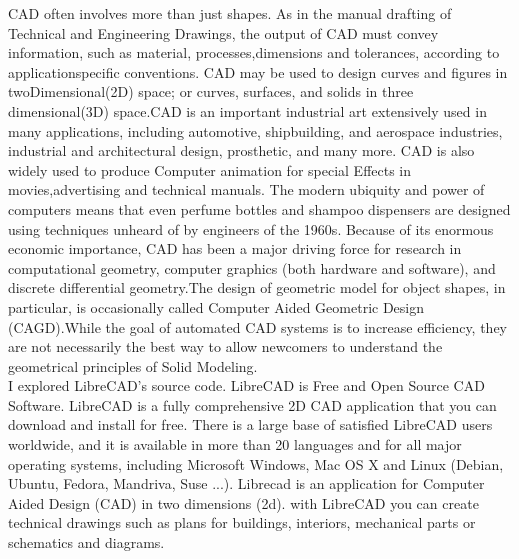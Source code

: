   CAD  often  involves  more  than  just  shapes.  As  in  the  manual  drafting  of  Technical  and  Engineering
Drawings,  the  output  of  CAD  must  convey  information,  such  as  material,  processes,dimensions  and
tolerances,  according  to  application­specific  conventions.  CAD  may  be  used  to  design  curves  and
figures  in  two­Dimensional(2D)  space;  or  curves,  surfaces,  and  solids  in  three  dimensional(3D)
space.CAD  is  an  important  industrial  art  extensively  used  in  many  applications,  including  automotive,
shipbuilding,  and  aerospace  industries,  industrial  and  architectural  design, prosthetic,  and  many  more.
CAD  is  also  widely  used  to  produce  Computer  animation  for  special  Effects  in  movies,advertising  and
technical  manuals.  The  modern  ubiquity  and  power  of  computers  means  that  even  perfume  bottles  and
shampoo  dispensers  are  designed  using   techniques unheard of by engineers of the 1960s. Because  of its
enormous  economic  importance,  CAD  has  been  a  major  driving  force  for  research  in  computational
geometry,  computer  graphics  (both  hardware  and  software),  and  discrete  differential  geometry.The
design  of  geometric  model  for  object  shapes,  in  particular,  is  occasionally  called  Computer ­Aided
Geometric  Design  (CAGD).While  the  goal  of  automated  CAD  systems  is to increase efficiency, they are
not  necessarily  the  best  way   to  allow  newcomers  to  understand  the  geometrical  principles  of  Solid
Modeling.\\

  I  explored  LibreCAD's  source  code.  LibreCAD is Free and Open Source CAD Software. LibreCAD is
a  fully  comprehensive  2D  CAD   application  that  you  can  download  and  install  for  free.  There  is  a  large
base  of  satisfied  LibreCAD   users  worldwide,  and  it  is  available  in  more  than  20  languages  and  for  all
major  operating  systems,  including  Microsoft  Windows,  Mac  OS  X  and  Linux  (Debian,  Ubuntu,
Fedora,  Mandriva,  Suse  ...).  Librecad  is  an  application  for Computer  Aided  Design  (CAD)  in  two
dimensions  (2d).  with  LibreCAD   you   can  create  technical  drawings  such  as  plans  for  buildings,  interiors,
mechanical parts or schematics and diagrams.\\

